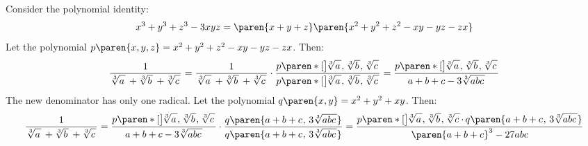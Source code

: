 Consider the polynomial identity:
\begin{equation*}
  x^3 + y^3 + z^3 - 3 x y z = \paren{x + y + z} \paren{x^2 + y^2 + z^2 - x y - y z - z x}
\end{equation*}
Let the polynomial $p\paren{x, y, z} = x^2 + y^2 + z^2 - x y - y z - z x$.
Then:
\begin{equation*}
  \frac{1}{\mspace{1mu}
           \sqrt[3]{a \vphantom{bc} \mspace{2mu}} \,
           + \sqrt[3]{b \vphantom{ac} \mspace{2mu}} \,
           + \sqrt[3]{c \vphantom{ab} \mspace{2mu}}
          \mspace{1mu}}
  = \frac{1}{\mspace{1mu}
             \sqrt[3]{a \vphantom{bc} \mspace{2mu}} \,
             + \sqrt[3]{b \vphantom{ac} \mspace{2mu}} \,
             + \sqrt[3]{c \vphantom{ab} \mspace{2mu}}
            \mspace{1mu}}
    \cdot \frac{p\paren*[\big]{\mspace{-2mu}
                               \sqrt[3]{a \vphantom{bc} \mspace{2mu}}, \mspace{1mu}
                               \sqrt[3]{b \vphantom{ac} \mspace{2mu}}, \mspace{1mu}
                               \sqrt[3]{c \vphantom{ab} \mspace{2mu}} \mspace{1mu}}}
               {p\paren*[\big]{\mspace{-2mu}
                               \sqrt[3]{a \vphantom{bc} \mspace{2mu}}, \mspace{1mu}
                               \sqrt[3]{b \vphantom{ac} \mspace{2mu}}, \mspace{1mu}
                               \sqrt[3]{c \vphantom{ab} \mspace{2mu}} \mspace{1mu}}}
  = \frac{p\paren*[\big]{\mspace{-2mu}
                         \sqrt[3]{a \vphantom{bc} \mspace{2mu}}, \mspace{1mu}
                         \sqrt[3]{b \vphantom{ac} \mspace{2mu}}, \mspace{1mu}
                         \sqrt[3]{c \vphantom{ab} \mspace{2mu}} \mspace{1mu}}}
         {\mspace{2mu} a + b + c - 3 \sqrt[3]{a b c \mspace{2mu}} \mspace{2mu}}
\end{equation*}
The new denominator has only one radical.
Let the polynomial $q\paren{x, y} = x^2 + y^2 + x y$.
Then:
\begin{equation*}
  \frac{1}{\mspace{1mu}
           \sqrt[3]{a \vphantom{bc} \mspace{2mu}} \,
           + \sqrt[3]{b \vphantom{ac} \mspace{2mu}} \,
           + \sqrt[3]{c \vphantom{ab} \mspace{2mu}}
          \mspace{1mu}}
  = \frac{p\paren*[\big]{\mspace{-2mu}
                         \sqrt[3]{a \vphantom{bc} \mspace{2mu}}, \mspace{1mu}
                         \sqrt[3]{b \vphantom{ac} \mspace{2mu}}, \mspace{1mu}
                         \sqrt[3]{c \vphantom{ab} \mspace{2mu}} \mspace{1mu}}}
         {\mspace{2mu} a + b + c - 3 \sqrt[3]{a b c \mspace{2mu}} \mspace{2mu}}
    \cdot \frac{q\paren{a + b + c \mspace{1mu}, \, 3 \sqrt[3]{a b c \mspace{2mu}}}}
               {q\paren{a + b + c \mspace{1mu}, \, 3 \sqrt[3]{a b c \mspace{2mu}}}}
  = \frac{p\paren*[\big]{\mspace{-2mu}
                         \sqrt[3]{a \vphantom{bc} \mspace{2mu}}, \mspace{1mu}
                         \sqrt[3]{b \vphantom{ac} \mspace{2mu}}, \mspace{1mu}
                         \sqrt[3]{c \vphantom{ab} \mspace{2mu}} \mspace{1mu}}
          \! \cdot \mspace{-1mu}
          q\paren{a + b + c \mspace{1mu}, \, 3 \sqrt[3]{a b c \mspace{2mu}}}}
         {\mspace{1mu} \paren{a + b + c}^3 - 27 a b c \mspace{1mu}}
\end{equation*}
